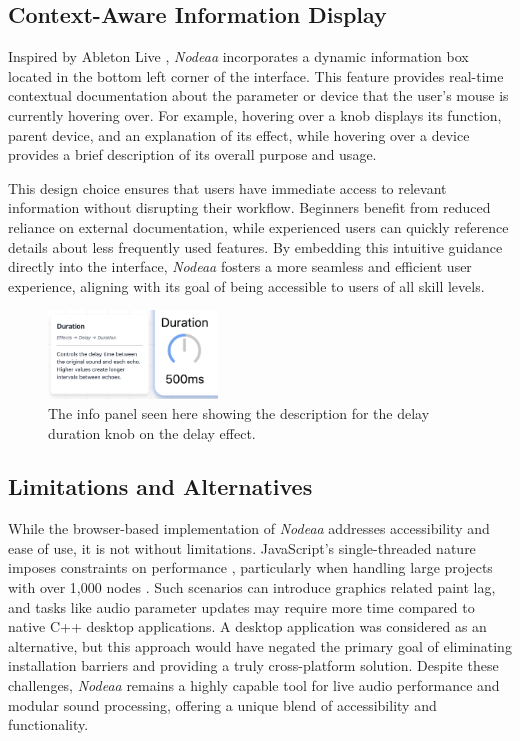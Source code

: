 \documentclass[10pt,twocolumn]{article}
\begin{document}
\subsection{Context-Aware Information Display}

Inspired by Ableton Live \cite{robinson2014ableton}, \textit{Nodeaa} incorporates a dynamic information box located in the bottom left corner of the interface. This feature provides real-time contextual documentation about the parameter or device that the user’s mouse is currently hovering over. For example, hovering over a knob displays its function, parent device, and an explanation of its effect, while hovering over a device provides a brief description of its overall purpose and usage.

This design choice ensures that users have immediate access to relevant information without disrupting their workflow. Beginners benefit from reduced reliance on external documentation, while experienced users can quickly reference details about less frequently used features. By embedding this intuitive guidance directly into the interface, \textit{Nodeaa} fosters a more seamless and efficient user experience, aligning with its goal of being accessible to users of all skill levels.

\begin{figure}[ht]
    \centering
    \includegraphics[width=0.4\textwidth]{images/nodeaainfo.png}
    \caption{The info panel seen here showing the description for the delay duration knob on the delay effect.}
    \label{fig:nodeaainfo}
\end{figure}

\subsection{Limitations and Alternatives}
While the browser-based implementation of \textit{Nodeaa} addresses accessibility and ease of use, it is not without limitations. JavaScript's single-threaded nature imposes constraints on performance \cite{verdu2015performance}, particularly when handling large projects with over 1,000 nodes \cite{chkec2019performance}. Such scenarios can introduce graphics related paint lag, and tasks like audio parameter updates may require more time compared to native C++ desktop applications. A desktop application was considered as an alternative, but this approach would have negated the primary goal of eliminating installation barriers and providing a truly cross-platform solution. Despite these challenges, \textit{Nodeaa} remains a highly capable tool for live audio performance and modular sound processing, offering a unique blend of accessibility and functionality.
\end{document}
